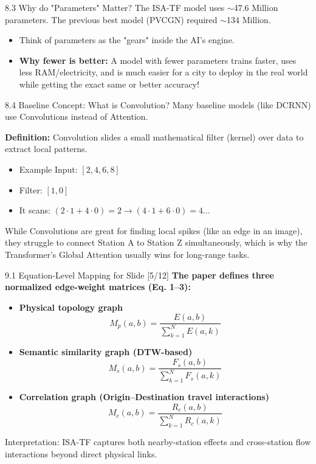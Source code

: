\documentclass[aspectratio=169]{beamer}
\begin{document}
\begin{frame}{8.3 Why do "Parameters" Matter?}
    The ISA-TF model uses $\sim$47.6 Million parameters. The previous best model (PVCGN) required $\sim$134 Million.
    
    \begin{itemize}
        \item Think of parameters as the "gears" inside the AI's engine. 
        \item \textbf{Why fewer is better:} A model with fewer parameters trains faster, uses less RAM/electricity, and is much easier for a city to deploy in the real world while getting the exact same or better accuracy!
    \end{itemize}
\end{frame}

\begin{frame}{8.4 Baseline Concept: What is Convolution?}
    Many baseline models (like DCRNN) use Convolutions instead of Attention.
    
    \textbf{Definition:} Convolution slides a small mathematical filter (kernel) over data to extract local patterns.
    \begin{itemize}
        \item Example Input: $[2, 4, 6, 8]$
        \item Filter: $[1, 0]$
        \item It scans: $(2 \cdot 1 + 4 \cdot 0) = 2 \rightarrow (4 \cdot 1 + 6 \cdot 0) = 4 \dots$
    \end{itemize}
    
    While Convolutions are great for finding local spikes (like an edge in an image), they struggle to connect Station A to Station Z simultaneously, which is why the Transformer's Global Attention usually wins for long-range tasks.
\end{frame}


\begin{frame}{9.1 Equation-Level Mapping for Slide [5/12]}
    \small
    \textbf{The paper defines three normalized edge-weight matrices (Eq. 1--3):}
    \begin{itemize}
        \item \textbf{Physical topology graph}
        \[
        M_{p}(a,b)=\frac{E(a,b)}{\sum_{k=1}^{N}E(a,k)}
        \]
        \item \textbf{Semantic similarity graph (DTW-based)}
        \[
        M_{s}(a,b)=\frac{F_{s}(a,b)}{\sum_{k=1}^{N}F_{s}(a,k)}
        \]
        \item \textbf{Correlation graph (Origin–Destination travel interactions)}
        \[
        M_{c}(a,b)=\frac{R_{c}(a,b)}{\sum_{k=1}^{N}R_{c}(a,k)}
        \]
    \end{itemize}
    \vspace{0.2cm}
    \footnotesize Interpretation: ISA-TF captures both nearby-station effects and cross-station flow interactions beyond direct physical links.
\end{frame}
\end{document}
